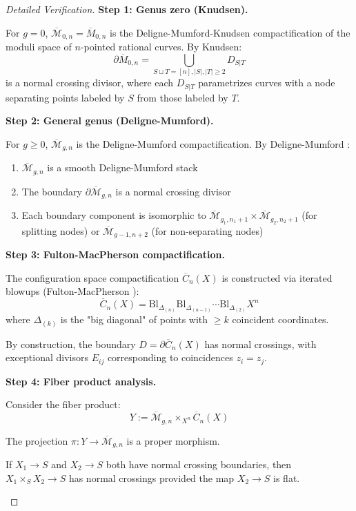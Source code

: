 \begin{proof}[Detailed Verification]

\textbf{Step 1: Genus zero (Knudsen).}

For $g=0$, $\overline{\mathcal{M}}_{0,n} = \overline{M}_{0,n}$ is the Deligne-Mumford-Knudsen 
compactification of the moduli space of $n$-pointed rational curves. By Knudsen:
$$\partial \overline{M}_{0,n} = \bigcup_{S \sqcup T = [n], |S|,|T| \geq 2} D_{S|T}$$
is a normal crossing divisor, where each $D_{S|T}$ parametrizes curves with a node 
separating points labeled by $S$ from those labeled by $T$.

\textbf{Step 2: General genus (Deligne-Mumford).}

For $g \geq 0$, $\overline{\mathcal{M}}_{g,n}$ is the Deligne-Mumford compactification. 
By Deligne-Mumford \cite{DM69}:
\begin{enumerate}
\item $\overline{\mathcal{M}}_{g,n}$ is a smooth Deligne-Mumford stack
\item The boundary $\partial \overline{\mathcal{M}}_{g,n}$ is a normal crossing divisor
\item Each boundary component is isomorphic to $\overline{\mathcal{M}}_{g_1,n_1+1} \times 
\overline{\mathcal{M}}_{g_2,n_2+1}$ (for splitting nodes) or 
$\overline{\mathcal{M}}_{g-1,n+2}$ (for non-separating nodes)
\end{enumerate}

\textbf{Step 3: Fulton-MacPherson compactification.}

The configuration space compactification $\overline{C}_n(X)$ is constructed via iterated 
blowups (Fulton-MacPherson \cite{FM94}):
$$\overline{C}_n(X) = \text{Bl}_{\Delta_{(n)}} \text{Bl}_{\Delta_{(n-1)}} \cdots 
\text{Bl}_{\Delta_{(2)}} X^n$$
where $\Delta_{(k)}$ is the "big diagonal" of points with $\geq k$ coincident coordinates.

By construction, the boundary $D = \partial \overline{C}_n(X)$ has normal crossings, 
with exceptional divisors $E_{ij}$ corresponding to coincidences $z_i = z_j$.

\textbf{Step 4: Fiber product analysis.}

Consider the fiber product:
$$Y := \overline{\mathcal{M}}_{g,n} \times_{X^n} \overline{C}_n(X)$$

The projection $\pi: Y \to \overline{\mathcal{M}}_{g,n}$ is a proper morphism.

\begin{lemma}\label{lem:fiber-product-NC}
If $X_1 \to S$ and $X_2 \to S$ both have normal crossing boundaries, then 
$X_1 \times_S X_2 \to S$ has normal crossings provided the map $X_2 \to S$ is flat.
\end{lemma}


\end{proof}
